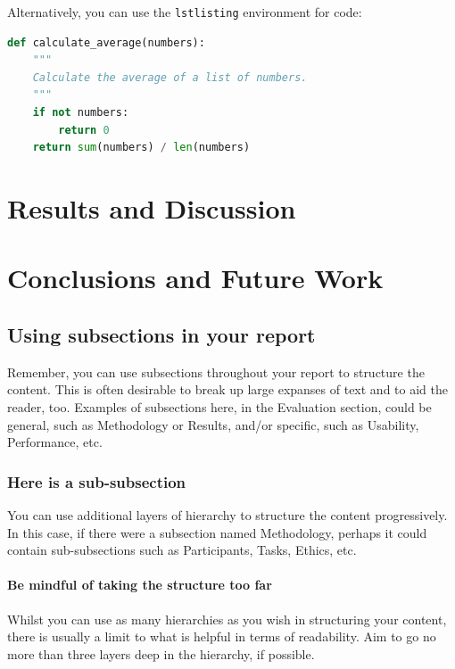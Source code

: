 \documentclass[12pt,a4paper]{article}
\begin{document}
Alternatively, you can use the \texttt{lstlisting} environment for code:

\begin{lstlisting}[language=Python, caption={Python code example}, label=lst:example]
def calculate_average(numbers):
    """
    Calculate the average of a list of numbers.
    """
    if not numbers:
        return 0
    return sum(numbers) / len(numbers)
\end{lstlisting}

\section{Results and Discussion}
\label{sec:results}


\section{Conclusions and Future Work}
\label{sec:conclusions}

\subsection{Using subsections in your report}

Remember, you can use subsections throughout your report to structure the content. This is often desirable to break up large expanses of text and to aid the reader, too. Examples of subsections here, in the Evaluation section, could be general, such as Methodology or Results, and/or specific, such as Usability, Performance, etc.

\subsubsection{Here is a sub-subsection}

You can use additional layers of hierarchy to structure the content progressively. In this case, if there were a subsection named Methodology, perhaps it could contain sub-subsections such as Participants, Tasks, Ethics, etc.

\paragraph{Be mindful of taking the structure too far}

Whilst you can use as many hierarchies as you wish in structuring your content, there is usually a limit to what is helpful in terms of readability. Aim to go no more than three layers deep in the hierarchy, if possible.
\end{document}
